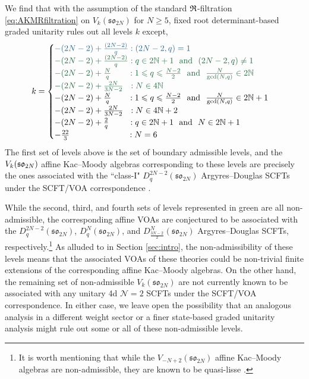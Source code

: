 We find that with the assumption of the standard $\mathfrak{R}$-filtration \eqref{eq:AKMRfiltration} on $V_k(\mathfrak{so}_{2N})$ for $N \geqslant 5$, fixed root determinant-based graded unitarity rules out all levels $k$ except,  
\begin{equation} \label{eq:VkSOfullresults}
    k = \begin{cases}
        \textcolor{knownSCFTtext}{-(2N-2) + \frac{(2N-2)}{q}: (2N-2, q) = 1} \\
        \textcolor{conjecturedSCFTtext}{-(2N-2) + \frac{(2N-2)}{q}: q \in 2\mathbb{N}+1 \ \ \text{and} \ \ (2N-2, q) \neq 1} \\
        \textcolor{conjecturedSCFTtext}{-(2N-2) + \frac{N}{q} \qquad : 1 \leqslant q \leqslant \frac{N-2}{2}  \ \ \text{and} \ \  \frac{N}{\text{gcd}(N,q)} \in 2\mathbb{N}} \\
        \textcolor{conjecturedSCFTtext}{-(2N-2) + \frac{2N}{3N-2} \ \ : N \in 4\mathbb{N}} \\
        -(2N-2) + \frac{N}{q} \qquad : 1 \leqslant q \leqslant \frac{N-2}{2} \ \ \text{and} \ \ \frac{N}{\text{gcd}(N,q)} \in 2\mathbb{N}+1  \\
        -(2N-2) + \frac{2N}{3N-2} \ \ : N \in 4\mathbb{N}+2 \\
        -(2N-2) + \frac{2}{q} \qquad \ : q \in 2\mathbb{N}+1 \ \ \text{and} \ \ N \in 2\mathbb{N}+1 \\
        -\frac{22}{3} \qquad \qquad \qquad \ \ \ :N = 6
    \end{cases}
\end{equation}
The first set of levels above is the set of boundary admissible levels, and the $V_k(\mathfrak{so}_{2N})$ affine Kac--Moody algebras corresponding to these levels are precisely the ones associated with the ``class-I" $D_q^{2N-2}(\mathfrak{so}_{2N})$ Argyres--Douglas SCFTs under the SCFT/VOA correspondence \cite{Xie:2016evu, Song:2017oew}. 

While the second, third, and fourth sets of levels represented in green are all non-admissible, the corresponding affine VOAs are conjectured to be associated with the $D_q^{2N-2}(\mathfrak{so}_{2N})$, $D_q^{N}(\mathfrak{so}_{2N})$, and $D_{\frac{3N-2}{2}}^{N}(\mathfrak{so}_{2N})$ Argyres--Douglas SCFTs, respectively.\footnote{It is worth mentioning that while the $V_{-N+2}(\mathfrak{so}_{2N})$ affine Kac--Moody algebras are non-admissible, they are known to be quasi-lisse \cite{arakawa2017sheets}.} As alluded to in Section \ref{sec:intro}, the non-admissibility of these levels means that the associated VOAs of these theories could be non-trivial finite extensions of the corresponding affine Kac--Moody algebras. On the other hand, the remaining set of non-admissible $V_k(\mathfrak{so}_{2N})$ are not currently known to be associated with any unitary 4d $\mathcal{N} = 2$ SCFTs under the SCFT/VOA correspondence. In either case, we leave open the possibility that an analogous analysis in a different weight sector or a finer state-based graded unitarity analysis might rule out some or all of these non-admissible levels.